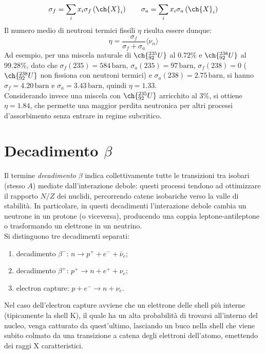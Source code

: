 \begin{equation}
	\sigma_f = \sum_{i} x_i \sigma_f\left( \ch{X}_i \right) \qquad \sigma_a = \sum_{i} x_i \sigma_a\left( \ch{X}_i \right)
	\label{eq:2.21}
\end{equation}
Il numero medio di neutroni termici fissili $ \eta $ risulta essere dunque:
\begin{equation}
	\eta = \frac{\sigma_f}{\sigma_f + \sigma_a} \langle \nu_n \rangle
	\label{eq:2.22}
\end{equation}
Ad esempio, per una miscela naturale di $ \ch{^{235}_{92} U} $ al $ 0.72\% $ e $ \ch{^{238}_{92} U} $ al $ 99.28\% $, dato che $ \sigma_f(235) = 584\,\text{barn} $, $ \sigma_a(235) = 97\,\text{barn} $, $ \sigma_f(238) = 0 $ ($ \ch{^{238}_{92} U} $ non fissiona con neutroni termici) e $ \sigma_a(238) = 2.75\,\text{barn} $, si hanno $ \sigma_f = 4.20\,\text{barn} $ e $ \sigma_{a} = 3.43\,\text{barn} $, quindi $ \eta = 1.33 $.\\
Considerando invece una miscela con $ \ch{^{235}_{92} U} $ arricchito al $ 3\% $, si ottiene $ \eta = 1.84 $, che permette una maggior perdita neutronica per altri processi d'assorbimento senza entrare in regime subcritico.

\section{Decadimento \texorpdfstring{$ \beta $}{TEXT}}

Il termine \textit{decadimento $ \beta $} indica collettivamente tutte le transizioni tra isobari (stesso $ A $) mediate dall'interazione debole: questi processi tendono ad ottimizzare il rapporto $ N/Z $ dei nuclidi, percorrendo catene isobariche verso la valle di stabilità. In particolare, in questi decadimenti l'interazione debole cambia un neutrone in un protone (o viceversa), producendo una coppia leptone-antileptone o trasformando un elettrone in un neutrino.\\
Si distinguono tre decadimenti separati:
\begin{enumerate}
	\item decadimento $ \beta^- $: $ n \rightarrow p^+ + e^- + \bar{\nu}_e $;
	\item decadimento $ \beta^+ $: $ p^+ \rightarrow n + e^+ + \nu_e $;
	\item electron capture: $ p + e^- \rightarrow n + \nu_e $.
\end{enumerate}
Nel caso dell'electron capture avviene che un elettrone delle shell più interne (tipicamente la shell K), il quale ha un alta probabilità di trovarsi all'interno del nucleo, venga catturato da quest'ultimo, lasciando un buco nella shell che viene subito colmato da una transizione a catena degli elettroni dell'atomo, emettendo dei raggi X caratteristici.

